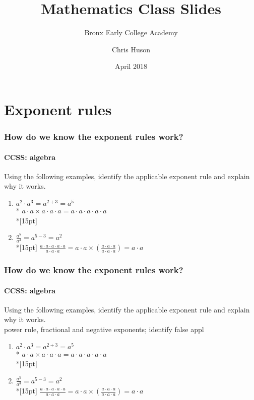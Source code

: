 \documentclass{beamer}
\title{Mathematics Class Slides}
\subtitle{Bronx Early College Academy}
\author{Chris Huson}
\date{April 2018}
\begin{document}
\frame{\titlepage}


\section{Exponent rules}
\frame
{
  \frametitle{How do we know the exponent rules work?}
  \framesubtitle{CCSS:  \qquad \alert{algebra}}

  \begin{block}{Using the following examples, identify the applicable exponent rule and explain why it works.}
    \begin{enumerate}
    \item $a^2 \cdot a^3 = a^{2+3} = a^5$\\*
    $a \cdot a \times a \cdot a \cdot a = a \cdot a \cdot a \cdot a \cdot a$\\*[15pt]
    \item $\displaystyle \frac{a^5}{a^3} = a^{5-3} = a^2$\\*[15pt]
    $\displaystyle \frac{a \cdot a \cdot a \cdot a \cdot a}{a \cdot a \cdot a} = a \cdot a \times \left( \frac{ a \cdot a \cdot a}{a \cdot a \cdot a} \right) = a \cdot a$
    \end{enumerate}
 \end{block}
}

\frame
{
  \frametitle{How do we know the exponent rules work?}
  \framesubtitle{CCSS:  \qquad \alert{algebra}}

  \begin{block}{Using the following examples, identify the applicable exponent rule and explain why it works.\\ \alert{power rule, fractional and negative exponents; identify false appl}}
    \begin{enumerate}
    \item $a^2 \cdot a^3 = a^{2+3} = a^5$\\*
    $a \cdot a \times a \cdot a \cdot a = a \cdot a \cdot a \cdot a \cdot a$\\*[15pt]
    \item $\displaystyle \frac{a^5}{a^3} = a^{5-3} = a^2$\\*[15pt]
    $\displaystyle \frac{a \cdot a \cdot a \cdot a \cdot a}{a \cdot a \cdot a} = a \cdot a \times \left( \frac{ a \cdot a \cdot a}{a \cdot a \cdot a} \right) = a \cdot a$
    \end{enumerate}
 \end{block}
}
\end{document}
